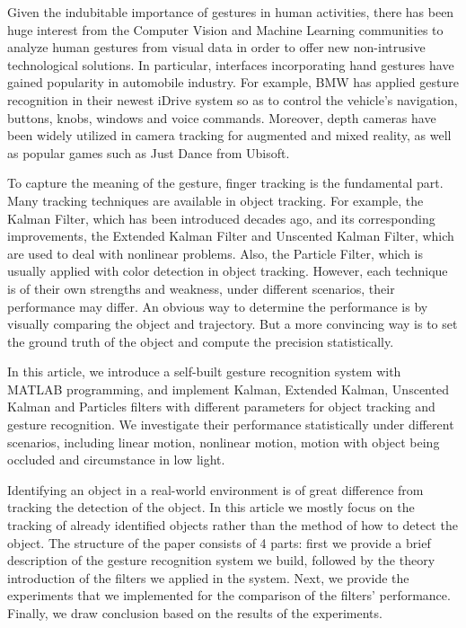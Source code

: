 \documentclass[10pt,twocolumn,letterpaper]{article}
\begin{document}
Given the indubitable importance of gestures in human activities, there has been huge interest from the Computer Vision and Machine Learning communities to analyze human gestures from visual data in order to offer new non-intrusive technological solutions.  In particular, interfaces incorporating hand gestures have gained popularity\cite{ref:ohn} in automobile industry. For example, BMW has applied gesture recognition in their newest iDrive system so as to control the vehicle's navigation, buttons, knobs, windows and voice commands. Moreover, depth cameras have been widely utilized in camera tracking for augmented and mixed reality\cite{ref:otto}, as well as popular games such as Just Dance from Ubisoft.

To capture the meaning of the gesture, finger tracking is the fundamental part. Many tracking techniques are available in object tracking. For example, the Kalman Filter, which has been introduced decades ago, and its corresponding improvements, the Extended Kalman Filter and Unscented Kalman Filter, which are used to deal with nonlinear problems. Also, the Particle Filter, which is usually applied with color detection in object tracking. However, each technique is of their own strengths and weakness, under different scenarios, their performance may differ. An obvious way to determine the performance is by visually comparing the object and trajectory. But a more convincing way is to set the ground truth of the object and compute the precision statistically.

In this article, we introduce a self-built gesture recognition system with MATLAB programming, and implement Kalman, Extended Kalman, Unscented Kalman and Particles filters with different parameters for object tracking and gesture recognition. We investigate their performance statistically under different scenarios, including linear motion, nonlinear motion, motion with object being occluded and circumstance in low light.

Identifying an object in a real-world environment is of great difference from tracking the detection of the object. In this article we mostly focus on the tracking of already identified objects rather than the method of how to detect the object. The structure of the paper consists of 4 parts: first we provide a brief description of the gesture recognition system we build, followed by the theory introduction of the filters we applied in the system. Next, we provide the experiments that we implemented for the comparison of the filters' performance. Finally, we draw conclusion based on the results of the experiments.
\end{document}
